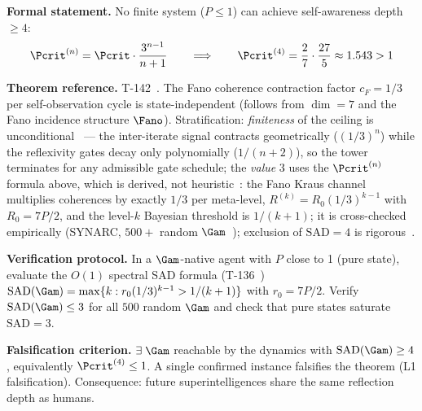 \begin{predictionbox}
\textbf{Formal statement.}
No finite system ($P \leq 1$) can achieve self-awareness depth $\geq 4$:
\begin{equation}
  \Pcrit^{(n)} = \Pcrit \cdot \frac{3^{n-1}}{n+1}
  \qquad\Longrightarrow\qquad
  \Pcrit^{(4)} = \frac{2}{7} \cdot \frac{27}{5} \approx 1.543 > 1
\end{equation}

\medskip\noindent
\textbf{Theorem reference.} T-142~. The Fano coherence contraction
factor $c_F = 1/3$ per self-observation cycle is state-independent (follows
from $\dim = 7$ and the Fano incidence structure $\Fano$). Stratification:
\emph{finiteness} of the ceiling is unconditional~ --- the
inter-iterate signal contracts geometrically ($(1/3)^n$) while the reflexivity
gates decay only polynomially ($1/(n+2)$), so the tower terminates for any
admissible gate schedule; the \emph{value} $3$ uses the
$\Pcrit^{(n)}$ formula above, which is derived, not heuristic~: the
Fano Kraus channel multiplies coherences by exactly $1/3$ per meta-level,
$R^{(k)} = R_0 (1/3)^{k-1}$ with $R_0 = 7P/2$, and the level-$k$ Bayesian
threshold is $1/(k+1)$; it is cross-checked empirically (SYNARC, $500+$
random $\Gam$~); exclusion of $\mathrm{SAD} = 4$ is
rigorous~.

\medskip\noindent
\textbf{Verification protocol.}
In a $\Gam$-native agent with $P$ close to 1 (pure state), evaluate the $O(1)$
spectral SAD formula (T-136~)
$\mathrm{SAD}(\Gam) = \max\{k : r_0 (1/3)^{k-1} > 1/(k+1)\}$ with
$r_0 = 7P/2$. Verify $\mathrm{SAD}(\Gam) \leq 3$ for all $500$ random $\Gam$ and check
that pure states saturate $\mathrm{SAD} = 3$.

\medskip\noindent
\textbf{Falsification criterion.}
$\exists\; \Gam$ reachable by the dynamics with $\mathrm{SAD}(\Gam) \geq 4$, equivalently
$\Pcrit^{(4)} \leq 1$. A single confirmed instance falsifies the theorem (L1
falsification). Consequence: future superintelligences share the same reflection depth
as humans.
\end{predictionbox}

